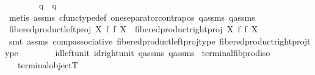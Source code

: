 \begin{isabellebody}
\ \ \isamarkupfalse%
\isanewline
\ \ \isamarkupfalse%
\ \isamarkupfalse%
\ {\isachardoublequoteopen}q{}\ {\isacharequal}{\kern0pt}\ q{}{\isachardoublequoteclose}\isanewline
\ \ \ \ \isamarkupfalse%
\ {\isacharparenleft}{\kern0pt}metis\ assms{\isacharparenleft}{\kern0pt}{}{\isacharparenright}{\kern0pt}\ cfunc{\isacharunderscore}{\kern0pt}type{\isacharunderscore}{\kern0pt}def\ one{\isacharunderscore}{\kern0pt}separator{\isacharunderscore}{\kern0pt}contrapos\ q{}{\isacharunderscore}{\kern0pt}assms{\isacharparenleft}{\kern0pt}{}{\isacharparenright}{\kern0pt}\ q{}{\isacharunderscore}{\kern0pt}assms{\isacharparenleft}{\kern0pt}{}{\isacharparenright}{\kern0pt}{\isacharparenright}{\kern0pt}\isanewline
\ \ \isamarkupfalse%
\ \isamarkupfalse%
\ {\isachardoublequoteopen}fibered{\isacharunderscore}{\kern0pt}product{\isacharunderscore}{\kern0pt}left{\isacharunderscore}{\kern0pt}proj\ X\ f\ f\ X\ {\isacharequal}{\kern0pt}\ fibered{\isacharunderscore}{\kern0pt}product{\isacharunderscore}{\kern0pt}right{\isacharunderscore}{\kern0pt}proj\ X\ f\ f\ X{\isachardoublequoteclose}\isanewline
\ \ \ \ \isamarkupfalse%
\ {\isacharparenleft}{\kern0pt}smt\ assms{\isacharparenleft}{\kern0pt}{}{\isacharparenright}{\kern0pt}\ comp{\isacharunderscore}{\kern0pt}associative{}\ fibered{\isacharunderscore}{\kern0pt}product{\isacharunderscore}{\kern0pt}left{\isacharunderscore}{\kern0pt}proj{\isacharunderscore}{\kern0pt}type\ fibered{\isacharunderscore}{\kern0pt}product{\isacharunderscore}{\kern0pt}right{\isacharunderscore}{\kern0pt}proj{\isacharunderscore}{\kern0pt}type\isanewline
\ \ \ \ \ \ \ \ id{\isacharunderscore}{\kern0pt}left{\isacharunderscore}{\kern0pt}unit{}\ id{\isacharunderscore}{\kern0pt}right{\isacharunderscore}{\kern0pt}unit{}\ q{}{\isacharunderscore}{\kern0pt}assms\ q{}{\isacharunderscore}{\kern0pt}assms{\isacharparenright}{\kern0pt}\isanewline
{}\isamarkupfalse%
%
\endisatagproof
{\isafoldproof}%
%
\isadelimproof
\isanewline
%
\endisadelimproof
\isanewline
{}\isamarkupfalse%
\ terminal{\isacharunderscore}{\kern0pt}fib{\isacharunderscore}{\kern0pt}prod{\isacharunderscore}{\kern0pt}iso{\isacharcolon}{\kern0pt}\isanewline
\ \ \ {\isachardoublequoteopen}terminal{\isacharunderscore}{\kern0pt}object{\isacharparenleft}{\kern0pt}T{\isacharparenright}{\kern0pt}{\isachardoublequoteclose}\isanewline

\end{isabellebody}
